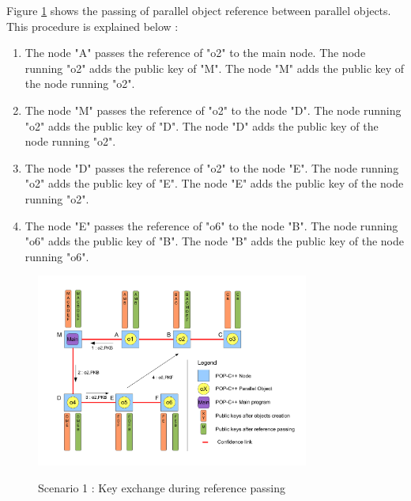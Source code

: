 \pagebreak


Figure \ref{fig:kex_ref_passing} shows the passing of parallel object reference between parallel objects. This procedure is explained below : 
\begin{enumerate}
\item The node "A" passes the reference of "o2" to the main node. The node running "o2" adds the public key of "M". The node "M" adds the public key of the node running "o2".
\item The node "M" passes the reference of "o2" to the node "D". The node running "o2" adds the public key of "D". The node "D" adds the public key of the node running "o2".
\item The node "D" passes the reference of "o2" to the node "E". The node running "o2" adds the public key of "E". The node "E" adds the public key of the node running "o2".
\item The node "E" passes the reference of "o6" to the node "B". The node running "o6" adds the public key of "B". The node "B" adds the public key of the node running "o6".
\end{enumerate}
\begin{figure}[ht]
	\caption{Scenario 1 : Key exchange during reference passing}
  	\centering
	\includegraphics[width=0.8\textwidth]{../ref_passing.pdf}
	\label{fig:kex_ref_passing}
\end{figure}

\pagebreak
